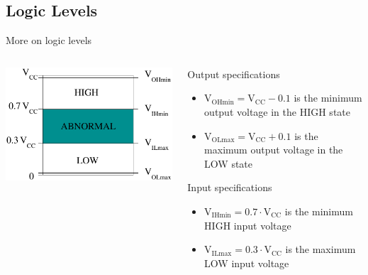 \subsection{Logic Levels}

\begin{frame}{More on logic levels}
  \begin{columns}
    \begin{column}{4cm}
      \includegraphics[scale=0.6]{CMOSLogicLevelsDetailed}
    \end{column}
    \begin{column}{6cm}
      Output specifications
      \begin{itemize}
        \item $\textrm{V}_{\textrm{OHmin}} = \textrm{V}_{\textrm{CC}} - 0.1$ is the minimum output voltage in the HIGH state
        \item $\textrm{V}_{\textrm{OLmax}} = \textrm{V}_{\textrm{CC}} + 0.1$ is the maximum output voltage in the LOW state
      \end{itemize}
      Input specifications
      \begin{itemize}
        \item $\textrm{V}_{\textrm{IHmin}} = 0.7 \cdot \textrm{V}_{\textrm{CC}}$ is the minimum HIGH input voltage
        \item $\textrm{V}_{\textrm{ILmax}} = 0.3 \cdot \textrm{V}_{\textrm{CC}}$ is the maximum LOW input voltage
      \end{itemize}
    \end{column}
  \end{columns}
\end{frame}

